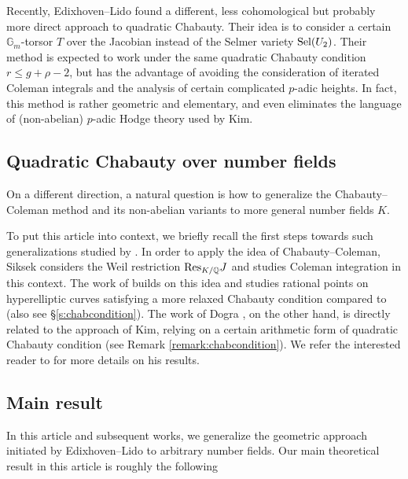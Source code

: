 \documentclass[11pt,oneside]{amsart}
\theoremstyle{plain}
\theoremstyle{definition}
\DeclareMathOperator{\Gm}{\mathbb{G}_m}
\def\Q{\mathbb{Q}}
\def\Gm{{\mathbb{G}_m}}
\begin{document}
Recently, Edixhoven--Lido \cite{EL19} found a different, less cohomological but probably more direct approach to quadratic Chabauty. Their idea is to consider a certain $\Gm$-torsor $T$ over the Jacobian instead of the Selmer variety $\textup{Sel}(U_2)$. Their method is expected to work under the same quadratic Chabauty condition $r \le g+\rho - 2$, but has the advantage of avoiding the consideration of iterated Coleman integrals and the analysis of certain complicated $p$-adic heights. In fact, this method is rather geometric and elementary, and even eliminates the language of (non-abelian) $p$-adic Hodge theory used by Kim. 

\subsection{Quadratic Chabauty over number fields} \label{ss:other_work_K}
On a different direction, a natural question is how to generalize the Chabauty--Coleman method and its non-abelian variants to more general number fields $K$. 

To put this article into context, we briefly recall the first steps towards such generalizations studied by \cite{siksek, BBBM19, Dogra19}. In order to  apply the idea of Chabauty--Coleman, Siksek \cite{siksek} considers the Weil restriction $\textup{Res}_{K/\Q} J$ and studies Coleman integration in this context. The work of \cite{BBBM19} builds on this idea and studies rational points on hyperelliptic curves satisfying a more relaxed Chabauty condition compared to \cite{siksek} (also see \S \ref{s:chabcondition}). The work of Dogra \cite{Dogra19}, on the other hand, is directly related to the approach of Kim, relying on a certain arithmetic form of quadratic Chabauty condition (see Remark \ref{remark:chabcondition}). We refer the interested reader to  \cite{Dogra19} for more details on his results. 

\subsection{Main result}
In this article and subsequent works, we generalize the geometric approach initiated by Edixhoven--Lido to arbitrary number fields. Our main theoretical result in this article is roughly the following 
\end{document}

